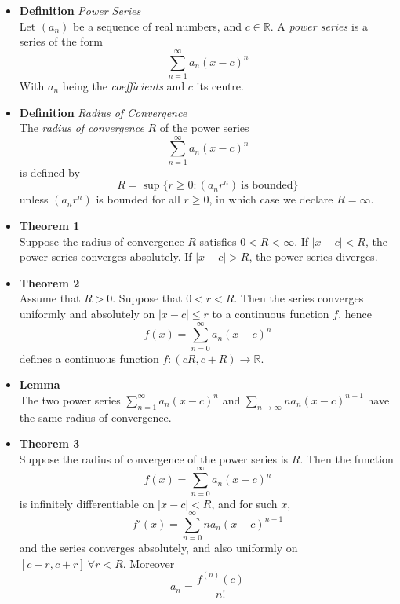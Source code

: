 \documentclass[11pt,a4paper]{article}
\begin{document}
\begin{itemize}
    \item \textbf{Definition} \emph{Power Series} \\
        Let $(a_n)$ be a sequence of real numbers, and $c \in \mathbb{R}$.
        A \emph{power series} is a series of the form
        \[
            \sum_{n=1}^\infty a_n{(x-c)}^n
        \]
        With $a_n$ being the \emph{coefficients} and $c$ its centre.

    \item \textbf{Definition} \emph{Radius of Convergence} \\
        The \emph{radius of convergence} $R$ of the power series
        \[
            \sum_{n=1}^\infty a_n{(x-c)}^n
        \]
        is defined by
        \[
            R = \sup \{ r \geq 0 : (a_n r^n) \ \text{is bounded} \}
        \]
        unless $(a_n r^n)$ is bounded for all $r \geq 0$, in which case we declare
        $R = \infty$.

    \item \textbf{Theorem 1} \\
        Suppose the radius of convergence $R$ satisfies $0 < R < \infty$.
        If $|x - c| < R$, the power series converges absolutely.
        If $|x - c| > R$, the power series diverges.

    \item \textbf{Theorem 2} \\
        Assume that $R > 0$.
        Suppose that $0 < r < R$.
        Then the series converges uniformly and absolutely on $|x-c| \leq r$ to a continuous
        function $f$.
        hence
        \[
            f(x) = \sum_{n=0}^\infty a_n{(x-c)}^n
        \]
        defines a continuous function $f : (c  R, c + R) \to \mathbb{R}$.

    \item \textbf{Lemma} \\
        The two power series $\sum_{n=1}^\infty a_n {(x-c)}^n$ and
        $\sum_{n \to \infty} n a_n {(x-c)}^{n-1}$ have the same radius of convergence.

    \item \textbf{Theorem 3} \\
        Suppose the radius of convergence of the power series is $R$.
        Then the function
        \[
        f(x) = \sum_{n=0}^\infty a_n {(x-c)}^n
        \]
        is infinitely differentiable on $|x-c| < R$, and for such $x$,
        \[
            f'(x) = \sum_{n=0}^\infty n a_n {(x-c)}^{n-1}
        \]
        and the series converges absolutely, and also uniformly on $[c-r, c+r] \ \forall r<R$.
        Moreover
        \[
            a_n = \frac{f^{(n)}(c)}{n!}
        \]

\end{itemize}
\end{document}
